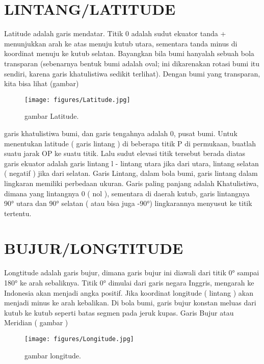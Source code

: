 \section{LINTANG/LATITUDE}

	Latitude adalah garis mendatar. Titik 0 adalah sudut ekuator tanda + menunjukkan arah ke atas menuju kutub utara,
	sementara tanda minus di koordinat menuju ke kutub selatan. Bayangkan bila bumi hanyalah sebuah bola transparan 
	(sebenarnya bentuk bumi adalah oval; ini dikarenakan rotasi bumi itu sendiri, karena garis khatulistiwa sedikit 
	terlihat). Dengan bumi yang transparan, kita bisa lihat (gambar)
	\begin{figure}[ht]
	\centerline{\texttt{[image: figures/Latitude.jpg]}}
	\caption{gambar Latitude.}
	\label{Gambar Latitude}
	\end{figure}
	garis khatulistiwa bumi, dan garis tengahnya adalah
	0, pusat bumi. Untuk menentukan latitude ( garis lintang ) di beberapa titik P di permukaan, buatlah suatu jarak OP 
	ke suatu titik. Lalu sudut elevasi titik tersebut berada diatas garis ekuator adalah garis lintang l - lintang utara
	jika dari utara, lintang selatan ( negatif ) jika dari selatan. 
	Garis Lintang, dalam bola bumi, garis lintang dalam lingkaran memiliki perbedaan ukuran. Garis paling panjang adalah 
	Khatulistiwa, dimana yang lintangnya 0 ( nol ), sementara di daerah kutub, garis lintangnya 90° utara dan 90° selatan
	( atau bisa juga -90°) lingkarannya menyusut ke titik tertentu.

\section{BUJUR/LONGTITUDE}

	Longtitude adalah garis bujur, dimana garis bujur ini diawali dari titik 0° sampai 180° ke arah sebaliknya. Titik 0° dimulai dari
	garis negara Inggris, mengarah ke Indonesia akan menjadi angka positif. Jika koordinat longitude ( lintang ) akan menjadi minus 
	ke arah kebalikan. Di bola bumi, garis bujur konstan meluas dari kutub ke kutub seperti batas segmen pada jeruk kupas. Garis Bujur atau
	Meridian ( gambar )
	\begin{figure}[ht]
	\centerline{\texttt{[image: figures/Longitude.jpg]}}
	\caption{gambar longitude.}
	\label{Gambar Longitude}
	\end{figure}
	
